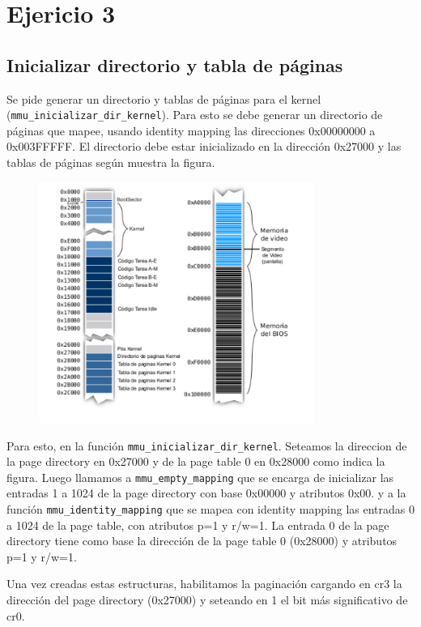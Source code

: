 \section{Ejericio 3}

\subsection{Inicializar directorio y tabla de páginas}

Se pide generar un directorio y tablas de páginas para el kernel (\texttt{mmu\_inicializar\_dir\_kernel}). Para esto se debe generar un directorio de páginas que mapee, usando identity mapping las direcciones 0x00000000 a 0x003FFFFF. El directorio debe estar inicializado en la dirección 0x27000 y las tablas de páginas según muestra la figura.

\begin{figure}[ht]
\centering
\includegraphics[width=90mm]{ej_3/img_ej_3.png}
\end{figure}

Para esto, en la función \texttt{mmu\_inicializar\_dir\_kernel}. Seteamos la direccion de la page directory en 0x27000 y de la page table 0 en 0x28000 como indica la figura.
Luego llamamos a \texttt{mmu\_empty\_mapping} que se encarga de inicializar las entradas 1 a 1024 de la page directory con base 0x00000 y atributos 0x00.
y a la función \texttt{mmu\_identity\_mapping} que se mapea con identity mapping las entradas 0 a 1024 de la page table, con atributos p=1 y r/w=1.
La entrada 0 de la page directory tiene como base la dirección de la page table 0 (0x28000) y atributos p=1 y r/w=1.

Una vez creadas estas estructuras, habilitamos la paginación cargando en cr3 la dirección del page directory (0x27000) y seteando en 1 el bit más significativo de cr0.

